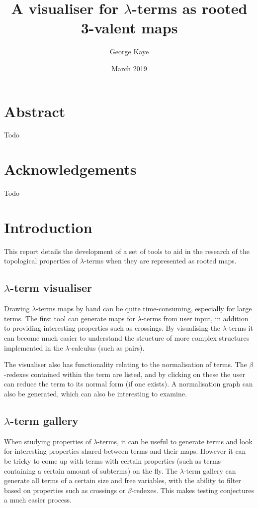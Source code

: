 \documentclass[12pt]{article}
\title{A visualiser for $\lambda$-terms as rooted 3-valent maps}
\author{George Kaye}
\date{March 2019}
\begin{document}


\tableofcontents

\newpage

\section{Abstract}
\label{sec:abstract}
Todo

\newpage

\section{Acknowledgements}
\label{sec:acks}
Todo


\newpage

\section{Introduction}
\label{sec:intro}

This report details the development of a set of tools to aid in the research of the topological properties of $\lambda$-terms when they are represented as rooted maps.

\subsection{\texorpdfstring{$\lambda$}{lambda}-term visualiser}

Drawing $\lambda$-terms maps by hand can be quite time-consuming, especially for large terms. The first tool can generate maps for $\lambda$-terms from user input, in addition to providing interesting properties such as crossings. By visualising the $\lambda$-terms it can become much easier to understand the structure of more complex structures implemented in the $\lambda$-calculus (such as pairs).

The visualiser also has functionality relating to the normalisation of terms. The $\beta$-redexes contained within the term are listed, and by clicking on these the user can reduce the term to its normal form (if one exists). A normalisation graph can also be generated, which can also be interesting to examine.

\subsection{\texorpdfstring{$\lambda$}{lambda}-term gallery}
When studying properties of $\lambda$-terms, it can be useful to generate terms and look for interesting properties shared between terms and their maps. However it can be tricky to come up with terms with certain properties (such as terms containing a certain amount of subterms) on the fly. The $\lambda$-term gallery can generate all terms of a certain size and free variables, with the ability to filter based on properties such as crossings or $\beta$-redexes. This makes testing conjectures a much easier process.
\end{document}
